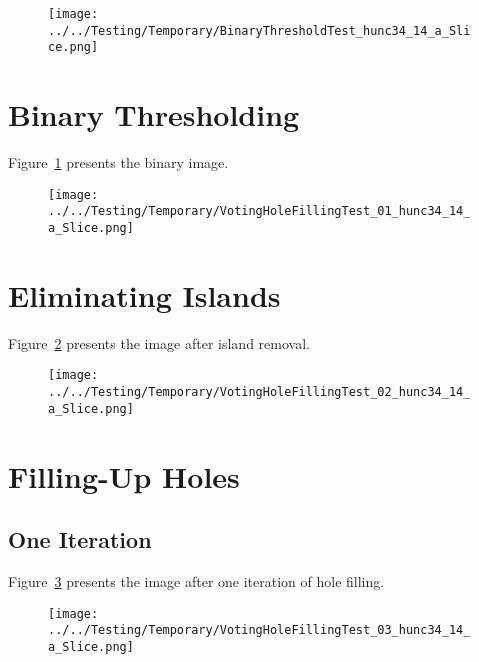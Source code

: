 \documentclass{InsightArticle}
\begin{document}
\clearpage
\begin{figure}
\center
\texttt{[image: ../../Testing/Temporary/BinaryThresholdTest\_hunc34\_14\_a\_Slice.png]}
\label{fig:BinaryImage2}
\end{figure}

\section{Binary Thresholding}

Figure~\ref{fig:BinaryImage2} presents the binary image.


\clearpage
\begin{figure}
\center
\texttt{[image: ../../Testing/Temporary/VotingHoleFillingTest\_01\_hunc34\_14\_a\_Slice.png]}
\label{fig:IslandRemovalImage2}
\end{figure}

\section{Eliminating Islands}

Figure~\ref{fig:IslandRemovalImage2} presents the image after island removal.


\clearpage
\begin{figure}
\center
\texttt{[image: ../../Testing/Temporary/VotingHoleFillingTest\_02\_hunc34\_14\_a\_Slice.png]}
\label{fig:HoleFillingIteration01Image2}
\end{figure}

\section{Filling-Up Holes}

\subsection{One Iteration}

Figure~\ref{fig:HoleFillingIteration01Image2} presents the image after one iteration of hole filling.



\clearpage
\begin{figure}
\center
\texttt{[image: ../../Testing/Temporary/VotingHoleFillingTest\_03\_hunc34\_14\_a\_Slice.png]}
\label{fig:HoleFillingIteration02Image2}
\end{figure}
\end{document}
